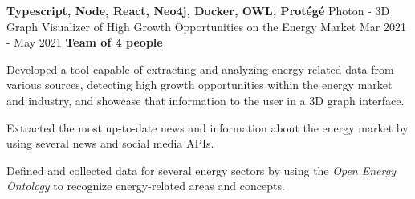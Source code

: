 \cventry
  {\textbf{Typescript, Node, React, Neo4j, Docker, OWL, Protégé}}
  {Photon - 3D Graph Visualizer of High Growth Opportunities on the Energy Market \href{https://github.com/EduRibeiro00/Photon-feup-lapd}{\faExternalLink}} %
  {Mar 2021 - May 2021}
  {\textbf{Team of 4 people}}
  {
    \begin{cvitems} %
      \item {Developed a tool capable of extracting and analyzing energy related data from various sources, detecting high growth opportunities within the energy market and industry, and showcase that information to the user in a 3D graph interface.}
      \item {Extracted the most up-to-date news and information about the energy market by using several news and social media APIs.}
      \item {Defined and collected data for several energy sectors by using the \textit{Open Energy Ontology} \href{https://openenergy-platform.org/ontology/}{\faExternalLink} to recognize energy-related areas and concepts.}
    \end{cvitems}
  }